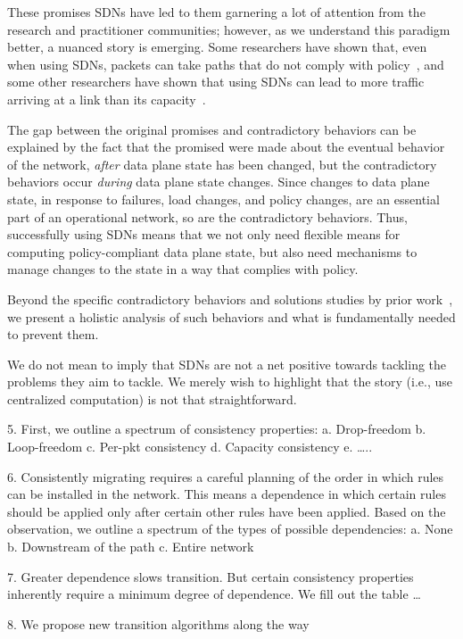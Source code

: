 These promises SDNs have led to them garnering a lot of attention from the research and practitioner communities; however, as we understand this paradigm better, a nuanced story is emerging.  Some researchers have shown that, even when using SDNs, packets can take paths that do not comply with policy~\cite{safeupdate,xx}, and some other researchers have shown that using SDNs can lead to more traffic arriving at a link than its capacity~\cite{swan}.

The gap between the original promises and contradictory behaviors can be explained by the fact that the promised were made about the eventual behavior of the network, {\em after} data plane state has been changed, but the contradictory behaviors occur {\em during} data plane state changes. Since changes to data plane state, in response to failures, load changes, and policy changes, are an essential part of an operational network, so are the contradictory behaviors. Thus, successfully using SDNs means that we not only need flexible means for computing policy-compliant data plane state,  but also need mechanisms to manage changes to the state in a way that complies with policy.

Beyond the specific contradictory behaviors and solutions studies by prior work~\cite{safeupdate,swan}, we present a holistic analysis of such behaviors and what is fundamentally needed to prevent them.

We do not mean to imply that SDNs are not a net positive towards tackling the problems they aim to tackle. We merely wish to highlight that the story (i.e., use centralized computation) is not that straightforward.


5.	First, we outline a spectrum of consistency properties:
a.	Drop-freedom
b.	Loop-freedom
c.	Per-pkt consistency
d.	Capacity consistency
e.	…..

6.	Consistently migrating requires a careful planning of the order in which rules can be installed in the network. This means a dependence in which certain rules should be applied only after certain other rules have been applied.  Based on the observation, we outline a spectrum of the types of possible dependencies:
a.	None
b.	Downstream of the path
c.	Entire network

7.	Greater dependence slows transition. But certain consistency properties inherently require a minimum degree of dependence. We fill out the table …

8.	We propose new transition algorithms along the way
